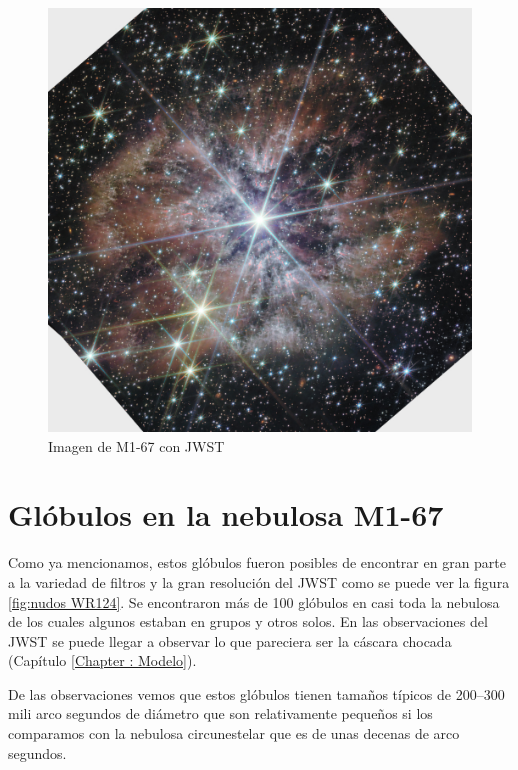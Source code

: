 \documentclass{book}
\begin{document}
\begin{figure}[htb]
    \centering
    \includegraphics[width=\textwidth]{M1-67-JWST.jpg}
    \caption{Imagen de M1-67 con JWST}
    \label{fig:M1-67JWST}
\end{figure}

\section{Glóbulos en la nebulosa M1-67}

Como ya mencionamos, estos glóbulos fueron posibles de encontrar en gran parte a la variedad de filtros y la gran resolución del JWST como se puede ver la figura \ref{fig:nudos WR124}. Se encontraron más de 100 glóbulos en casi toda la nebulosa de los cuales algunos estaban en grupos y otros solos. En las observaciones del JWST se puede llegar a observar lo que pareciera ser la cáscara chocada (Capítulo \ref{Chapter : Modelo}).

De las observaciones vemos que estos glóbulos tienen tamaños típicos de 200--300 mili arco segundos de diámetro que son relativamente pequeños si los comparamos con la nebulosa circunestelar que es de unas decenas de arco segundos.
\end{document}
